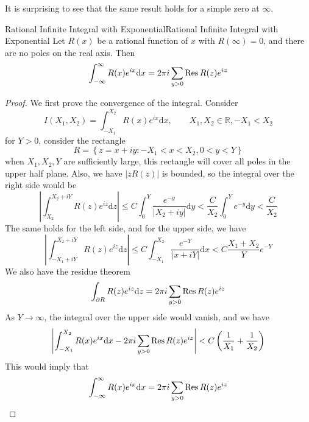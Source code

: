 \documentclass[../main.tex]{subfiles}
\begin{document}
It is surprising to see that the same result holds for a simple zero at $\infty $.
\begin{theorem}{Rational Infinite Integral with Exponential}{Rational Infinite Integral with Exponential}
	Let $R(x)$ be a rational function of $x$ with $R(\infty )=0$, and there are no poles on the real axis. Then
	\begin{equation}
		\int_{-\infty}^{\infty} R(x) e^{i x} \mathrm{d} x = 2 \pi i \sum_{y>0} \operatorname{Res} R(z) e^{i z}
	\end{equation}
\end{theorem}
\begin{proof}
	We first prove the convergence of the integral. Consider
	\begin{equation*}
		I(X_1,X_2) = \int_{-X_1}^{X_2} R(x) e^{i x} \mathrm{d} x, \qquad X_1,X_2\in \mathbb{R}, -X_1<X_2
	\end{equation*}
	for $Y>0$, consider the rectangle 
	\begin{equation*}
		R = \left\{ z=x+iy: -X_1< x < X_2, 0 <y < Y \right\}
	\end{equation*}
	when $X_1,X_2,Y$ are sufficiently large, this rectangle will cover all poles in the upper half plane. Also, we have $\left|zR(z)\right|$ is bounded, so the integral over the right side would be
	\begin{equation*}
		\left|\int_{X_2}^{X_2+iY} R(z) e^{iz} \mathrm{d} z\right| \leq C \int_0^Y \frac{e^{-y}}{\left|X_2+iy\right|} \mathrm{d} y < \frac{C}{X_2} \int_0^Y e^{-y} \mathrm{d} y < \frac{C}{X_2}
	\end{equation*}
	The same holds for the left side, and for the upper side, we have
	\begin{equation*}
	\left|\int_{-X_1+iY}^{X_2+iY} R(z) e^{iz} \mathrm{d} z\right| \leq C \int_{-X_1}^{X_2} \frac{e^{-Y}}{\left|x+iY\right|} \mathrm{d} x < C \frac{X_1+X_2}{Y} e^{-Y}
	\end{equation*}
	We also have the residue theorem
	\begin{equation*}
		\int_{\partial R} R(z) e^{iz} \mathrm{d} z = 2 \pi i \sum_{y>0} \operatorname{Res} R(z) e^{iz}
	\end{equation*}
	As $Y \rightarrow \infty $, the integral over the upper side would vanish, and we have
	\begin{equation*}
		\left|\int_{-X_1}^{X_2} R(x) e^{ix} \mathrm{d} x - 2 \pi i \sum_{y>0} \operatorname{Res} R(z) e^{iz}\right| < C \left(\frac{1}{X_1} + \frac{1}{X_2}\right)
	\end{equation*}
	This would imply that
	\begin{equation*}
		\int_{-\infty}^{\infty} R(x) e^{ix} \mathrm{d} x = 2 \pi i \sum_{y>0} \operatorname{Res} R(z) e^{iz}
	\end{equation*}
\end{proof}
\end{document}
